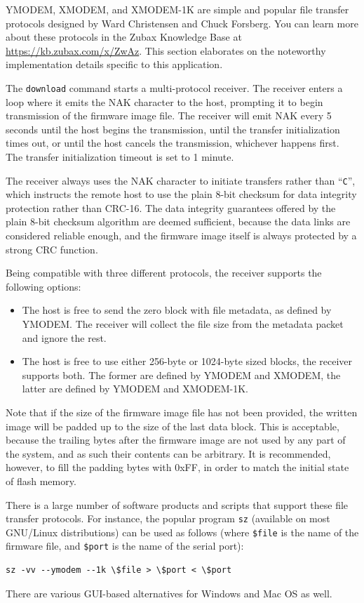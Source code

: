 \documentclass{zubaxdoc}
\begin{document}
YMODEM, XMODEM, and XMODEM-1K are simple and popular file transfer protocols designed by
Ward Christensen and Chuck Forsberg.
You can learn more about these protocols in the Zubax Knowledge Base at \url{https://kb.zubax.com/x/ZwAz}.
This section elaborates on the noteworthy implementation details specific to this application.

The \verb|download| command starts a multi-protocol receiver.
The receiver enters a loop where it emits the NAK character to the host,
prompting it to begin transmission of the firmware image file.
The receiver will emit NAK every 5 seconds until the host begins the transmission,
until the transfer initialization times out,
or until the host cancels the transmission, whichever happens first.
The transfer initialization timeout is set to 1 minute.

The receiver always uses the NAK character to initiate transfers rather than ``\verb|C|'',
which instructs the remote host to use the plain 8-bit checksum for data integrity protection
rather than CRC-16.
The data integrity guarantees offered by the plain 8-bit checksum algorithm are deemed sufficient,
because the data links are considered reliable enough,
and the firmware image itself is always protected by a strong CRC function.

Being compatible with three different protocols, the receiver supports the following options:
\begin{itemize}
    \item The host is free to send the zero block with file metadata, as defined by YMODEM.
          The receiver will collect the file size from the metadata packet and ignore the rest.
    
    \item The host is free to use either 256-byte or 1024-byte sized blocks, the receiver supports both.
          The former are defined by YMODEM and XMODEM, the latter are defined by YMODEM and XMODEM-1K.
\end{itemize}

Note that if the size of the firmware image file has not been provided,
the written image will be padded up to the size of the last data block.
This is acceptable, because the trailing bytes after the firmware image are
not used by any part of the system, and as such their contents can be arbitrary.
It is recommended, however, to fill the padding bytes with 0xFF,
in order to match the initial state of flash memory.

There is a large number of software products and scripts that support these file transfer protocols.
For instance, the popular program \verb|sz| (available on most GNU/Linux distributions) can be used as follows
(where \verb|$file| is the name of the firmware file, and \verb|$port| is the name of the serial port):
\begin{verbatim}
sz -vv --ymodem --1k \$file > \$port < \$port
\end{verbatim}
There are various GUI-based alternatives for Windows and Mac OS as well.
\end{document}
